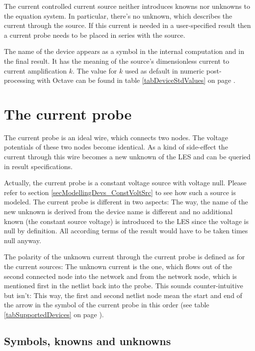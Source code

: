 The current controlled current source neither introduces knowns nor
unknowns to the equation system. In particular, there's no unknown, which
describes the current through the source. If this current is needed in a
user-specified result then a current probe needs to be placed in series
with the source.

The name of the device appears as a symbol in the internal computation and
in the final result. It has the meaning of the source's dimensionless
current to current amplification $k$. The value for $k$ used as default in
numeric post-processing with Octave can be found in table
\ref{tabDeviceStdValues} on page \pageref{tabDeviceStdValues}.


\section{The current probe}
\label{secModellingDevs_currentProbe}

The current probe is an ideal wire, which connects two nodes. The voltage
potentials of these two nodes become identical. As a kind of side-effect
the current through this wire becomes a new unknown of the LES and can be
queried in result specifications.

Actually, the current probe is a constant voltage source with voltage
null. Please refer to section \ref{secModellingDevs_ConstVoltSrc} to see
how such a source is modeled. The current probe is different in two
aspects: The way, the name of the new unknown is derived from the device
name is different and no additional known (the constant source voltage) is
introduced to the LES since the voltage is null by definition. All
according terms of the result would have to be taken times null anyway.

The polarity of the unknown current through the current probe is defined
as for the current sources: The unknown current is the one, which flows
out of the second connected node into the network and from the network
node, which is mentioned first in the netlist back into the probe. This
sounds counter-intuitive but isn't: This way, the first and second netlist
node mean the start and end of the arrow in the symbol of the current
probe in this order (see table \ref{tabSupportedDevices} on page
\pageref{tabSupportedDevices}).


\subsection{Symbols, knowns and unknowns}


